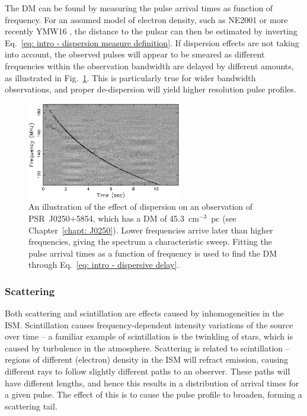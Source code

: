 The DM can be found by measuring the pulse arrival times as function of frequency. For an assumed model of electron density, such as NE2001 \citep{CLxx2002} or more recently YMW16 \citep{YMWx2016}, the distance to the pulsar can then be estimated by inverting Eq.~\eqref{eq: intro - dispersion measure definition}. If dispersion effects are not taking into account, the observed pulses will appear to be smeared as different frequencies within the observation bandwidth are delayed by different amounts, as illustrated in Fig.~\ref{fig: intro - DM illustration}. This is particularly true for wider bandwidth observations, and proper de-dispersion will yield higher resolution pulse profiles.
\begin{figure}
	\centering
	\includegraphics[width=0.6\textwidth]{Figures/Introduction/dispersed_data}
    \caption[The effect of dispersion on a pulse profile]{An illustration of the effect of dispersion on an observation of PSR~J0250+5854, which has a DM of 45.3~cm$^{-3}$~pc (see Chapter~\ref{chapt: J0250}). Lower frequencies arrive later than higher frequencies, giving the spectrum a characteristic sweep. Fitting the pulse arrival times as a function of frequency is used to find the DM through Eq.~\eqref{eq: intro - dispersive delay}.}
    \label{fig: intro - DM illustration} 
\end{figure}




\subsubsection{Scattering}
\label{sec: intro - observation processing - ISM effects - scattering}

Both scattering and scintillation are effects caused by inhomogeneities in the ISM. Scintillation causes frequency-dependent intensity variations of the source over time -- a familiar example of scintillation is the twinkling of stars, which is caused by turbulence in the atmosphere. Scattering is related to scintillation -- regions of different (electron) density in the ISM will refract emission, causing different rays to follow slightly different paths to an observer. These paths will have different lengths, and hence this results in a distribution of arrival times for a given pulse. The effect of this is to cause the pulse profile to broaden, forming a scattering tail.


